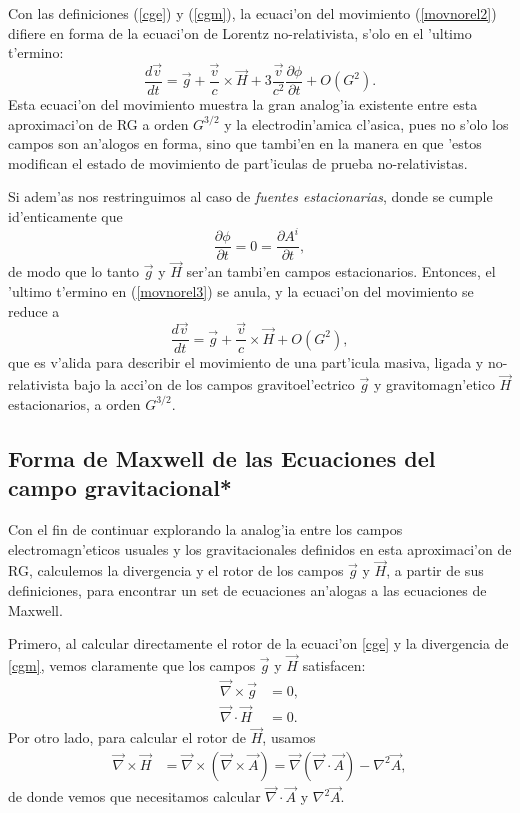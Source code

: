 Con las definiciones (\ref{cge}) y (\ref{cgm}), la ecuaci'on del movimiento (\ref{movnorel2}) difiere en forma de la ecuaci'on de Lorentz no-relativista, s'olo en el 'ultimo t'ermino:
\begin{equation}
\frac{d\vec{v}}{dt}=\vec{g}+\frac{\vec{v}}{c}\times\vec{H}+3\frac{\vec{v}}{c^2}\frac{\partial \phi}{\partial t}+O\left(G^2\right).\label{movnorel3}
\end{equation}
Esta ecuaci'on del movimiento muestra la gran analog'ia existente entre esta aproximaci'on de RG a orden $G^{3/2}$ y la electrodin'amica cl'asica, pues no s'olo los campos son an'alogos en forma, sino que tambi'en en la manera en que 'estos modifican el estado de movimiento de part'iculas de prueba no-relativistas.

Si adem'as nos restringuimos al caso de \textit{fuentes estacionarias}, donde se cumple id'enticamente que
\begin{equation}
\frac{\partial\phi}{\partial t}=0=\frac{\partial A^i}{\partial t},
\end{equation}
de modo que lo tanto $\vec{g}$ y $\vec{H}$ ser'an tambi'en campos estacionarios. Entonces, el 'ultimo t'ermino en (\ref{movnorel3}) se anula, y la ecuaci'on del movimiento se reduce a
\begin{equation}\boxed{
\frac{d\vec{v}}{dt}=\vec{g}+\frac{\vec{v}}{c}\times\vec{H}+O\left(G^2\right),}\label{movnorel4}
\end{equation}
que es v'alida para describir el movimiento de una part'icula masiva, ligada y no-relativista bajo la acci'on de los campos gravitoel'ectrico $\vec{g}$ y gravitomagn'etico $\vec{H}$ estacionarios, a orden $G^{3/2}$.

\subsection{Forma de Maxwell de las Ecuaciones del campo gravitacional*}

Con el fin de continuar explorando la analog'ia entre los campos electromagn'eticos usuales y los gravitacionales definidos en esta aproximaci'on de RG, calculemos la divergencia y el rotor de los campos $\vec{g}$ y $\vec{H}$, a partir de sus definiciones, para encontrar un set de ecuaciones an'alogas a las ecuaciones de Maxwell.

Primero, al calcular directamente el rotor de la ecuaci'on \eqref{cge} y la divergencia de \eqref{cgm}, vemos claramente que los campos $\vec{g}$ y $\vec{H}$ satisfacen:
\begin{align}
\vec{\nabla}\times\vec{g} &= 0,\\
\vec{\nabla}\cdot\vec{H} &= 0.
\end{align}
Por otro lado, para calcular el rotor de $\vec{H}$, usamos
\begin{align}
\vec{\nabla}\times\vec{H} &= \vec{\nabla}\times(\vec{\nabla}\times\vec{A})= \vec{\nabla}(\vec{\nabla}\cdot\vec{A})-{\nabla}^2\vec{A},\label{rotorhcasi}
\end{align}
de donde vemos que necesitamos calcular $\vec{\nabla}\cdot\vec{A}$ y ${\nabla}^2\vec{A}$.

